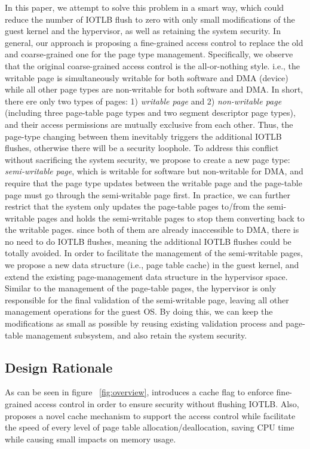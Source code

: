 In this paper, we attempt to solve this problem in a smart way, which could reduce the number of IOTLB flush to zero with only small modifications of the guest kernel and the hypervisor,
as well as retaining the system security.
In general, our approach is proposing a fine-grained access control to replace the old and coarse-grained one for the page type management.
Specifically, we observe that the original coarse-grained access control is the all-or-nothing style. i.e., the writable page is simultaneously writable for both software and DMA (device) while all other page types are non-writable for both software and DMA.
In short, there ere only two types of pages: 1) \emph{writable page} and 2) \emph{non-writable page} (including three page-table page types and two segment descriptor page types), and their access permissions are mutually exclusive from each other.
Thus, the page-type changing between them inevitably triggers the additional IOTLB flushes, otherwise there will be a security loophole.
To address this conflict without sacrificing the system security, we propose to create a new page type: \emph{semi-writable page}, which is writable for software but non-writable for DMA,
and require that the page type updates between the writable page and the page-table page must go through the semi-writable page first.
In practice,  we can further restrict that the system only updates the page-table pages to/from the semi-writable pages and holds the semi-writable pages to stop them converting back to the writable pages.
since both of them are already inaccessible to DMA, there is no need to do IOTLB flushes, meaning the additional IOTLB flushes could be totally avoided.
In order to facilitate the management of the semi-writable pages, we propose a new data structure (i.e., page table cache) in the guest kernel, and extend the existing page-management data structure in the hypervisor space.
Similar to the management of the page-table pages, the hypervisor is only responsible for the final validation of the semi-writable page, leaving all other management operations for the guest OS.
By doing this, we can keep the modifications as small as possible by reusing existing validation process and page-table management subsystem, and also retain the system security.


\subsection{Design Rationale}
As can be seen in figure ~\ref{fig:overview}, \name introduces a cache flag to enforce fine-grained access control in order to ensure security without flushing IOTLB. Also, \name proposes a novel cache mechanism to support the access control while facilitate the speed of every level of page table allocation/deallocation, saving CPU time while causing small impacts on memory usage.

